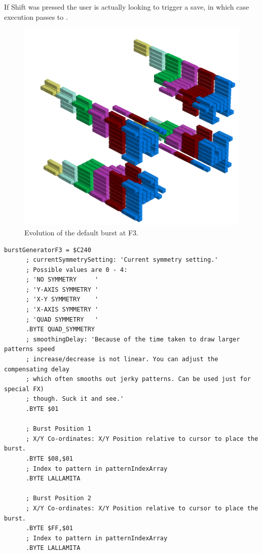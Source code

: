 If Shift was pressed the user is actually looking to trigger a save, in which case execution passes to .
\clearpage
\begin{figure}[H]
    \centering
    \begin{adjustbox}{width=12cm,center}
      \includegraphics[width=12cm]{src/patterns/bursts/pattern2-45.png}%
    \end{adjustbox}
\caption{Evolution of the default burst at F3.}
\end{figure}
\clearpage

\begin{lstlisting}[caption=Source code for the F3 Burst.]
burstGeneratorF3 = $C240
      ; currentSymmetrySetting: 'Current symmetry setting.'
      ; Possible values are 0 - 4:
      ; 'NO SYMMETRY     '
      ; 'Y-AXIS SYMMETRY '
      ; 'X-Y SYMMETRY    '
      ; 'X-AXIS SYMMETRY '
      ; 'QUAD SYMMETRY   '
      .BYTE QUAD_SYMMETRY
      ; smoothingDelay: 'Because of the time taken to draw larger patterns speed
      ; increase/decrease is not linear. You can adjust the compensating delay
      ; which often smooths out jerky patterns. Can be used just for special FX)
      ; though. Suck it and see.'
      .BYTE $01

      ; Burst Position 1  
      ; X/Y Co-ordinates: X/Y Position relative to cursor to place the burst.
      .BYTE $08,$01
      ; Index to pattern in patternIndexArray
      .BYTE LALLAMITA

      ; Burst Position 2
      ; X/Y Co-ordinates: X/Y Position relative to cursor to place the burst.
      .BYTE $FF,$01
      ; Index to pattern in patternIndexArray
      .BYTE LALLAMITA

\end{lstlisting}

